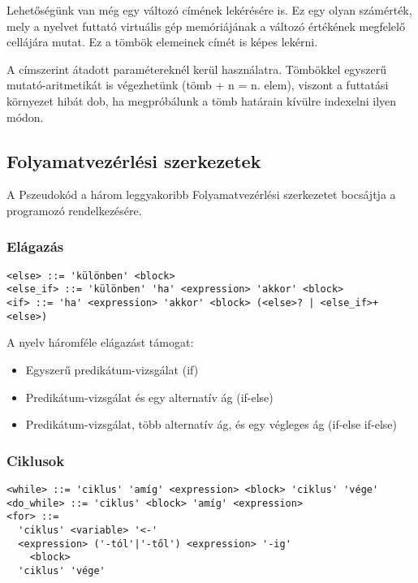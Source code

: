 Lehetőségünk van még egy változó címének lekérésére is. Ez egy olyan számérték, mely a nyelvet futtató virtuális gép memóriájának a változó értékének megfelelő cellájára mutat. Ez a tömbök elemeinek címét is képes lekérni.

A címszerint átadott paramétereknél kerül használatra. Tömbökkel egyszerű mutató-aritmetikát is végezhetünk (tömb + n = n. elem), viszont a futtatási környezet hibát dob, ha megpróbálunk a tömb határain kívülre indexelni ilyen módon.

\subsection{Folyamatvezérlési szerkezetek}

A Pszeudokód a három leggyakoribb Folyamatvezérlési szerkezetet bocsájtja a programozó rendelkezésére.

\subsubsection{Elágazás}

\begin{footnotesize}
\begin{verbatim}
<else> ::= 'különben' <block>
<else_if> ::= 'különben' 'ha' <expression> 'akkor' <block>
<if> ::= 'ha' <expression> 'akkor' <block> (<else>? | <else_if>+ <else>)
\end{verbatim}
\end{footnotesize}

A nyelv háromféle elágazást támogat: 

\begin{itemize}
  \item Egyszerű predikátum-vizsgálat (if)
  \item Predikátum-vizsgálat és egy alternatív ág (if-else)
  \item Predikátum-vizsgálat, több alternatív ág, és egy végleges ág (if-else if-else)
\end{itemize}

\subsubsection{Ciklusok}

\begin{footnotesize}
\begin{verbatim}
<while> ::= 'ciklus' 'amíg' <expression> <block> 'ciklus' 'vége'
<do_while> ::= 'ciklus' <block> 'amíg' <expression>
<for> ::= 
  'ciklus' <variable> '<-' 
  <expression> ('-tól'|'-től') <expression> '-ig'
    <block> 
  'ciklus' 'vége'
\end{verbatim}
\end{footnotesize}

